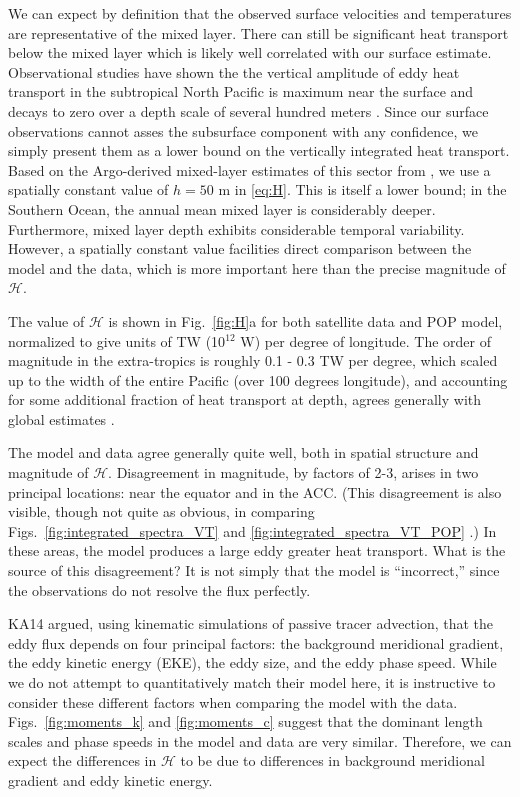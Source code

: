 \documentclass[10pt]{article}
\begin{document}
We can expect by definition that the observed surface velocities and temperatures are representative of the mixed layer. There can still be significant heat transport below the mixed layer which is likely well correlated with our surface estimate. Observational studies have shown the the vertical amplitude of eddy heat transport in the subtropical North Pacific is maximum near the surface and decays to zero over a depth scale of several hundred meters \citep{RoemmichGilson2001,QiuChen2005}. Since our surface observations cannot asses the subsurface component with any confidence, we simply present them as a lower bound on the vertically integrated heat transport. Based on the Argo-derived mixed-layer estimates of this sector from \citet{HolteTalley2009}, we use a spatially constant value of $h = 50$ m in \eqref{eq:H}. This is itself a lower bound; in the Southern Ocean, the annual mean mixed layer is considerably deeper. Furthermore, mixed layer depth exhibits considerable temporal variability. However, a spatially constant value facilities direct comparison between the model and the data, which is more important here than the precise magnitude of $\mathcal{H}$.

The value of $\mathcal{H}$ is shown in Fig.~\ref{fig:H}a for both satellite data and POP model, normalized to give units of TW (10$^{12}$ W) per degree of longitude. The order of magnitude in the extra-tropics is roughly 0.1 - 0.3 TW per degree, which scaled up to the width of the entire Pacific (over 100 degrees longitude), and accounting for some additional fraction of heat transport at depth, agrees generally with global estimates \citep{JayneMarotzke2002,VolkovEtAl2008,DongEtAl2014}. 

The model and data agree generally quite well, both in spatial structure and magnitude of $\mathcal{H}$. Disagreement in magnitude, by factors of 2-3, arises in two principal locations: near the equator and in the ACC. (This disagreement is also visible, though not quite as obvious, in comparing Figs.~\ref{fig:integrated_spectra_VT} and \ref{fig:integrated_spectra_VT_POP} .) In these areas, the model produces a large eddy greater heat transport. What is the source of this disagreement? It is not simply that the model is ``incorrect,'' since the observations do not resolve the flux perfectly.

KA14 argued, using kinematic simulations of passive tracer advection, that the eddy flux depends on four principal factors: the background meridional gradient, the eddy kinetic energy (EKE), the eddy size, and the eddy phase speed. While we do not attempt to quantitatively match their model here, it is instructive to consider these different factors when comparing the model with the data. Figs.~\ref{fig:moments_k} and \ref{fig:moments_c} suggest that the dominant length scales and phase speeds in the model and data are very similar. Therefore, we can expect the differences in $\mathcal{H}$ to be due to differences in background meridional gradient and eddy kinetic energy.
\end{document}
